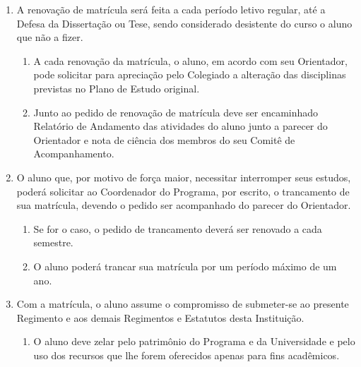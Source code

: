 \documentclass{article}
\newcommand{\singleitem}{\item[Parágrafo Único.]}
\begin{document}
\begin{enumerate}
	\item A renovação de matrícula será feita a cada período letivo regular, até a Defesa da Dissertação ou Tese, sendo considerado desistente do curso o aluno que não a fizer.
	\begin{enumerate}
		\item A cada renovação da matrícula, o aluno, em acordo com seu Orientador, pode solicitar para apreciação pelo Colegiado a alteração das disciplinas previstas no Plano de Estudo original.
		\item Junto ao pedido de renovação de matrícula deve ser encaminhado Relatório de Andamento das atividades do aluno junto a parecer do Orientador e nota de ciência dos membros do seu Comitê de Acompanhamento.
	\end{enumerate}

	\item O aluno que, por motivo de força maior, necessitar interromper seus estudos, poderá solicitar ao Coordenador do Programa, por escrito, o trancamento de sua matrícula, devendo o pedido ser acompanhado do parecer do Orientador.
	\begin{enumerate}
		\item Se for o caso, o pedido de trancamento deverá ser renovado a cada semestre.
		\item O aluno poderá trancar sua matrícula por um período máximo de um ano.
	\end{enumerate}

	\item Com a matrícula, o aluno assume o compromisso de submeter-se ao presente Regimento e aos demais Regimentos e Estatutos desta Instituição.
	\begin{enumerate}
		\singleitem O aluno deve zelar pelo patrimônio do Programa e da Universidade e pelo uso dos recursos que lhe forem oferecidos apenas para fins acadêmicos.
	\end{enumerate}
\end{enumerate}
\end{document}
